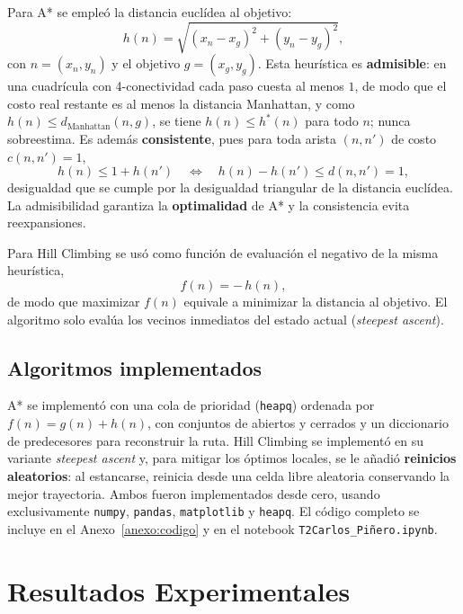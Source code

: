 \documentclass[12pt,a4paper]{article}
\newcommand{\code}[1]{\texttt{#1}}
\begin{document}
Para A* se emple\'o la distancia eucl\'idea al objetivo:
\begin{equation}
\label{eq:heuristica}
h(n) = \sqrt{(x_n - x_g)^2 + (y_n - y_g)^2},
\end{equation}
con $n=(x_n,y_n)$ y el objetivo $g=(x_g,y_g)$. Esta heur\'istica es
\textbf{admisible}: en una cuadr\'icula con 4-conectividad cada paso cuesta al menos
$1$, de modo que el costo real restante es al menos la distancia Manhattan, y como
$h(n) \le d_{\text{Manhattan}}(n,g)$, se tiene $h(n) \le h^*(n)$ para todo $n$; nunca
sobreestima. Es adem\'as \textbf{consistente}, pues para toda arista $(n,n')$ de costo
$c(n,n')=1$,
\begin{equation}
\label{eq:consistencia}
h(n) \le 1 + h(n') \quad\Longleftrightarrow\quad h(n)-h(n') \le d(n,n')=1,
\end{equation}
desigualdad que se cumple por la desigualdad triangular de la distancia eucl\'idea. La
admisibilidad garantiza la \textbf{optimalidad} de A* y la consistencia evita
reexpansiones.

Para Hill Climbing se us\'o como funci\'on de evaluaci\'on el negativo de la misma
heur\'istica,
\begin{equation}
\label{eq:evaluacion}
f(n) = -\,h(n),
\end{equation}
de modo que maximizar $f(n)$ equivale a minimizar la distancia al objetivo. El algoritmo
solo eval\'ua los vecinos inmediatos del estado actual (\emph{steepest ascent}).

\subsection{Algoritmos implementados}
\label{sec:algoritmos}

A* se implement\'o con una cola de prioridad (\code{heapq}) ordenada por
$f(n)=g(n)+h(n)$, con conjuntos de abiertos y cerrados y un diccionario de predecesores
para reconstruir la ruta. Hill Climbing se implement\'o en su variante
\emph{steepest ascent} y, para mitigar los \'optimos locales, se le a\~nadi\'o
\textbf{reinicios aleatorios}: al estancarse, reinicia desde una celda libre aleatoria
conservando la mejor trayectoria. Ambos fueron implementados desde cero, usando
exclusivamente \code{numpy}, \code{pandas}, \code{matplotlib} y \code{heapq}. El
c\'odigo completo se incluye en el Anexo~\ref{anexo:codigo} y en el notebook
\code{T2Carlos\_Pi\~nero.ipynb}.

\section{Resultados Experimentales}
\label{sec:resultados}
\end{document}

